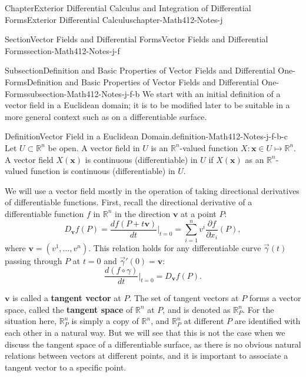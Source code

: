 \documentclass[oneside,10pt,]{book}
\newcommand{\terminology}[1]{\textbf{#1}}
\numberwithin{equation}{section}
\newcommand{\bx}{\mathbf{x}}
\newcommand{\bbR}{\mathbb{R}}
\begin{document}
\begin{chapterptx}{Chapter}{Exterior Differential Calculus and Integration of Differential Forms}{}{Exterior Differential Calculus}{}{}{chapter-Math412-Notes-j}
%
\begin{sectionptx}{Section}{Vector Fields and Differential Forms}{}{Vector Fields and Differential Forms}{}{}{section-Math412-Notes-j-f}
%
%
\typeout{************************************************}
\typeout{************************************************}
%
\begin{subsectionptx}{Subsection}{Definition and Basic Properties of Vector Fields and Differential One-Forms}{}{Definition and Basic Properties of Vector Fields and Differential One-Forms}{}{}{subsection-Math412-Notes-j-f-b}
We start with an initial definition of a vector field in a Euclidean domain; it is to be modified later to be suitable in a more general context such as on a differentiable surface.%
\begin{definition}{Definition}{Vector Field in a Euclidean Domain.}{definition-Math412-Notes-j-f-b-c}%
Let \(U\subset \bbR^{n}\) be open. A vector field in \(U\) is an \(\bbR^{n}\)-valued function \(X:\bx\in U\mapsto \bbR^{n}\). A vector field \(X(\bx)\) is continuous (differentiable) in \(U\) if \(X(\bx)\) as an \(\bbR^{n}\)-valued function is continuous (differentiable) in \(U\).%
\end{definition}
We will use a vector field mostly in the operation of taking directional derivatives of differentiable functions. First, recall the directional derivative of a differentiable function \(f\) in \(\bbR^{n}\) in the direction \({\mathbf v}\) at a point \(P\):%
\begin{equation*}
D_{{\mathbf v}}f(P)=\frac{d f(P+t{\mathbf v})}{dt}\Big|_{t=0}
=\sum_{i=1}^{n} v^{i}\frac{\partial f}{\partial x_{i}}(P),
\end{equation*}
where \({\mathbf v}=(v^{1},\ldots, v^{n})\).  This relation holds for any differentiable curve \(\vec{\gamma}(t)\) passing through \(P\) at \(t=0\) and \(\vec{\gamma}'(0)={\mathbf v}\):%
\begin{equation*}
\frac{d (f\circ \gamma )}{dt}\Big|_{t=0}=D_{{\mathbf v}}f(P).
\end{equation*}
%
\par
\({\mathbf v}\) is called a \terminology{tangent vector} at \(P\). The set of tangent vectors at \(P\) forms a vector space, called the \terminology{tangent space} of \({\mathbb R}^{n}\) at \(P\), and is denoted as \({\mathbb R}^{n}_{P}\). For the situation here, \({\mathbb R}^{n}_{P}\) is simply a copy of \(\bbR^{n}\), and \({\mathbb R}^{n}_{P}\) at different \(P\) are identified with each other in a natural way. But we will see that this is not the case when we discuss the tangent space of a differentiable surface, as there is no obvious natural relations between vectors at different points, and it is important to associate a tangent vector to a specific point.%

\end{subsectionptx}
\end{sectionptx}
\end{chapterptx}
\end{document}

